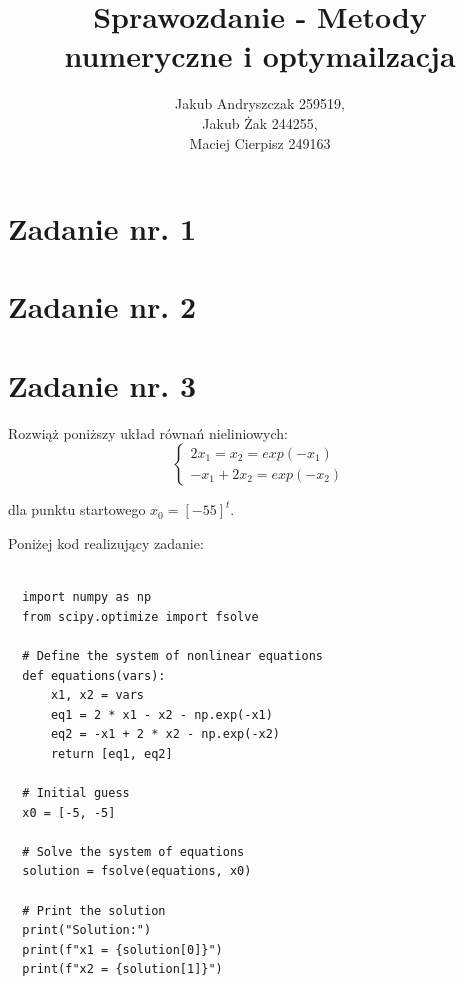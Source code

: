 \documentclass{article}
\begin{document}
\title{Sprawozdanie - Metody numeryczne i optymailzacja}
\author{Jakub Andryszczak 259519,\\ Jakub Żak 244255,\\ Maciej Cierpisz 249163}
\date{}
\maketitle

\newpage
\tableofcontents

\newpage
\section{Zadanie nr. 1}



\section{Zadanie nr. 2}

\section{Zadanie nr. 3}

Rozwiąż poniższy układ równań nieliniowych:\\
\begin{equation}
  \begin{cases}
    2x_1=x_2=exp(-x_1)\\
    -x_1+2x_2=exp(-x_2)
  \end{cases}
\end{equation}

dla punktu startowego $x_0=[-5 5]^t$.

Poniżej kod realizujący zadanie:

\begin{lstlisting}
  
  import numpy as np
  from scipy.optimize import fsolve
  
  # Define the system of nonlinear equations
  def equations(vars):
      x1, x2 = vars
      eq1 = 2 * x1 - x2 - np.exp(-x1)
      eq2 = -x1 + 2 * x2 - np.exp(-x2)
      return [eq1, eq2]
  
  # Initial guess
  x0 = [-5, -5]
  
  # Solve the system of equations
  solution = fsolve(equations, x0)
  
  # Print the solution
  print("Solution:")
  print(f"x1 = {solution[0]}")
  print(f"x2 = {solution[1]}")

\end{lstlisting}
\end{document}
